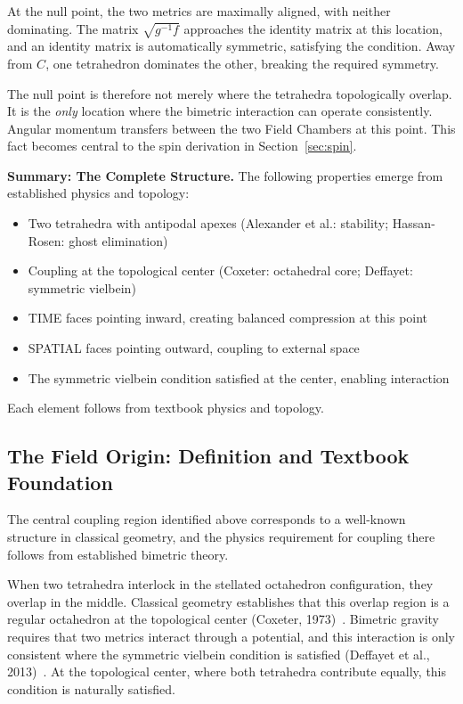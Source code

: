 \documentclass[aps,prd,preprint,superscriptaddress,showpacs,preprintnumbers,amsmath,amssymb,nofootinbib]{revtex4-2}
\begin{document}
At the null point, the two metrics are maximally aligned, with neither dominating. The matrix $\sqrt{g^{-1}f}$ approaches the identity matrix at this location, and an identity matrix is automatically symmetric, satisfying the condition. Away from $C$, one tetrahedron dominates the other, breaking the required symmetry.

The null point is therefore not merely where the tetrahedra topologically overlap. It is the \emph{only} location where the bimetric interaction can operate consistently. Angular momentum transfers between the two Field Chambers at this point. This fact becomes central to the spin derivation in Section~\ref{sec:spin}.

\textbf{Summary: The Complete Structure.} The following properties emerge from established physics and topology:
\begin{itemize}
\item Two tetrahedra with antipodal apexes (Alexander et al.: stability; Hassan-Rosen: ghost elimination)
\item Coupling at the topological center (Coxeter: octahedral core; Deffayet: symmetric vielbein)
\item TIME faces pointing inward, creating balanced compression at this point
\item SPATIAL faces pointing outward, coupling to external space
\item The symmetric vielbein condition satisfied at the center, enabling interaction
\end{itemize}
Each element follows from textbook physics and topology.

\subsection{The Field Origin: Definition and Textbook Foundation}
\label{subsec:field-origin}

The central coupling region identified above corresponds to a well-known structure in classical geometry, and the physics requirement for coupling there follows from established bimetric theory.

When two tetrahedra interlock in the stellated octahedron configuration, they overlap in the middle. Classical geometry establishes that this overlap region is a regular octahedron at the topological center (Coxeter, 1973)~\cite{coxeter1973}. Bimetric gravity requires that two metrics interact through a potential, and this interaction is only consistent where the symmetric vielbein condition is satisfied (Deffayet et al., 2013)~\cite{deffayet2013}. At the topological center, where both tetrahedra contribute equally, this condition is naturally satisfied.
\end{document}
